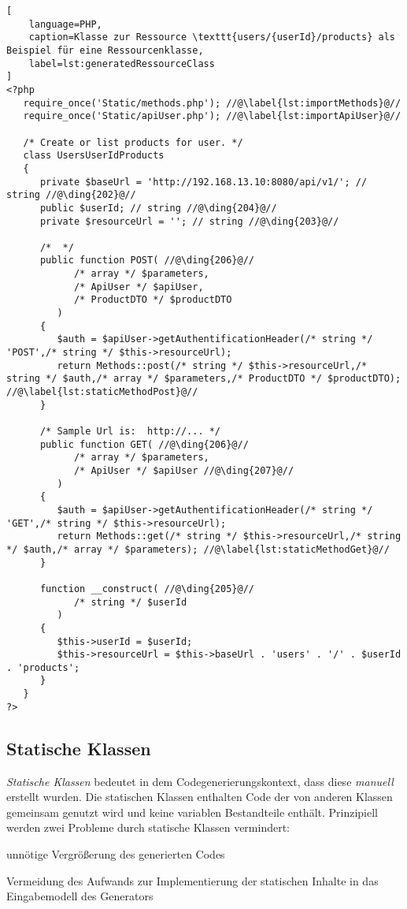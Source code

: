 \begin{minipage}{\textwidth}
\begin{lstlisting}[
    language=PHP,
    caption=Klasse zur Ressource \texttt{users/{userId}/products} als Beispiel für eine Ressourcenklasse,
    label=lst:generatedRessourceClass
]
<?php
   require_once('Static/methods.php'); //@\label{lst:importMethods}@//
   require_once('Static/apiUser.php'); //@\label{lst:importApiUser}@//

   /* Create or list products for user. */
   class UsersUserIdProducts
   {
      private $baseUrl = 'http://192.168.13.10:8080/api/v1/'; // string //@\ding{202}@//
      public $userId; // string //@\ding{204}@//
      private $resourceUrl = ''; // string //@\ding{203}@//

      /*  */
      public function POST( //@\ding{206}@//
            /* array */ $parameters,
            /* ApiUser */ $apiUser,
            /* ProductDTO */ $productDTO
         )
      {
         $auth = $apiUser->getAuthentificationHeader(/* string */ 'POST',/* string */ $this->resourceUrl);
         return Methods::post(/* string */ $this->resourceUrl,/* string */ $auth,/* array */ $parameters,/* ProductDTO */ $productDTO); //@\label{lst:staticMethodPost}@//
      }

      /* Sample Url is:  http://... */
      public function GET( //@\ding{206}@//
            /* array */ $parameters,
            /* ApiUser */ $apiUser //@\ding{207}@//
         )
      {
         $auth = $apiUser->getAuthentificationHeader(/* string */ 'GET',/* string */ $this->resourceUrl);
         return Methods::get(/* string */ $this->resourceUrl,/* string */ $auth,/* array */ $parameters); //@\label{lst:staticMethodGet}@//
      }

      function __construct( //@\ding{205}@//
            /* string */ $userId
         )
      {
         $this->userId = $userId;
         $this->resourceUrl = $this->baseUrl . 'users' . '/' . $userId . 'products';
      }
   }
?>
\end{lstlisting}
\end{minipage}

\subsection{Statische Klassen}
\label{sec:static_classes}

\emph{Statische Klassen} bedeutet in dem Codegenerierungskontext, dass diese \emph{manuell} erstellt wurden. Die statischen Klassen enthalten Code der von anderen Klassen gemeinsam genutzt wird und keine variablen Bestandteile enthält. Prinzipiell werden zwei Probleme durch statische Klassen vermindert:
\begin{compactenum}
  \item unnötige Vergrößerung des generierten Codes
  \item Vermeidung des Aufwands zur Implementierung der statischen Inhalte in das Eingabemodell des Generators
\end{compactenum}

